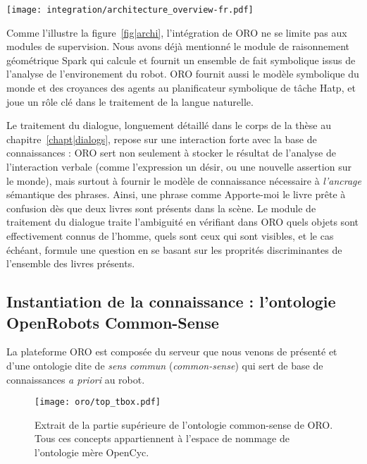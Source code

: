 \begin{figure*}[thpb]
  \centering
  \texttt{[image: integration/architecture\_overview-fr.pdf]}

  \caption {Schéma de l'architecture logicielle déployée sur les robots PR2 et
  Jido, deux robots de services interagissant avec des hommes au LAAS-CNRS. Le
  serveur ORO apparait en vert, au milieu.}

  \label{fig|archi}
\end{figure*}

Comme l'illustre la figure~\ref{fig|archi}, l'intégration de ORO ne se limite
pas aux modules de supervision. Nous avons déjà mentionné le module de
raisonnement géométrique {\sc Spark} qui calcule et fournit un ensemble de fait
symbolique issus de l'analyse de l'environement du robot. ORO fournit aussi le
modèle symbolique du monde et des croyances des agents au planificateur
symbolique de tâche {\sc Hatp}, et joue un rôle clé dans le traitement de la
langue naturelle.

Le traitement du dialogue, longuement détaillé dans le corps de la thèse au
chapitre~\ref{chapt|dialogs}, repose sur une interaction forte avec la base de
connaissances : ORO sert non seulement à stocker le résultat de l'analyse de
l'interaction verbale (comme l'expression un désir, ou une nouvelle assertion
sur le monde), mais surtout à fournir le modèle de connaissance nécessaire à
\emph{l'ancrage} sémantique des phrases. Ainsi, une phrase comme \og
Apporte-moi le livre \fg prête à confusion dès que deux livres sont présents
dans la scène. Le module de traitement du dialogue traite l'ambiguité en
vérifiant dans ORO quels objets sont effectivement connus de l'homme, quels
sont ceux qui sont visibles, et le cas échéant, formule une question en se
basant sur les proprités discriminantes de l'ensemble des livres présents.


\subsection*{Instantiation de la connaissance : l'ontologie OpenRobots Common-Sense}
\label{sect|oro-commonsense}

La plateforme ORO est composée du serveur que nous venons de présenté et d'une
ontologie dite de \emph{sens commun} (\emph{common-sense}) qui sert de base de
connaissances \textit{a priori} au robot.

\begin{figure}
    \centering
    \texttt{[image: oro/top\_tbox.pdf]}

    \caption{Extrait de la partie supérieure de l'ontologie common-sense de
    ORO. Tous ces concepts appartiennent à l'espace de nommage de l'ontologie
    mère {\sc OpenCyc}.}

    \label{fig|upper_tbox}
\end{figure}

